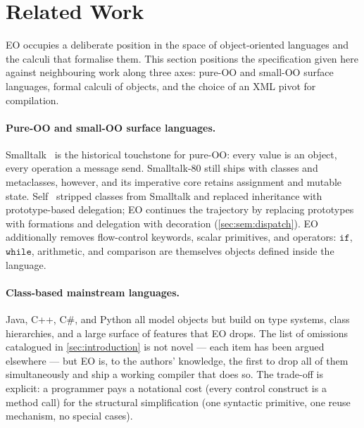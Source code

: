 
\section{Related Work}\label{sec:related}

EO occupies a deliberate position in the space of object-oriented languages
  and the calculi that formalise them.
This section positions the specification given here against neighbouring
  work along three axes:
  pure-OO and small-OO surface languages,
  formal calculi of objects,
  and the choice of an XML pivot for compilation.

\paragraph{Pure-OO and small-OO surface languages.}
Smalltalk~\citep{goldbergrobson1983smalltalk} is the historical touchstone
  for pure-OO: every value is an object, every operation a message send.
Smalltalk-80 still ships with classes and metaclasses, however, and its
  imperative core retains assignment and mutable state.
Self~\citep{ungar1987self} stripped classes from Smalltalk and replaced
  inheritance with prototype-based delegation; EO continues the trajectory
  by replacing prototypes with formations and delegation with decoration
  (\cref{sec:sem:dispatch}).
EO additionally removes flow-control keywords, scalar primitives, and
  operators: \(\mathtt{if}\), \(\mathtt{while}\), arithmetic, and
  comparison are themselves objects defined inside the language.

\paragraph{Class-based mainstream languages.}
Java, C++, C\#, and Python all model objects but build on type systems,
  class hierarchies, and a large surface of features that EO drops.
The list of omissions catalogued in \cref{sec:introduction} is not novel
  --- each item has been argued elsewhere ---
  but EO is, to the authors' knowledge, the first to drop all of them
  simultaneously and ship a working compiler that does so.
The trade-off is explicit: a programmer pays a notational cost (every
  control construct is a method call) for the structural simplification
  (one syntactic primitive, one reuse mechanism, no special cases).

